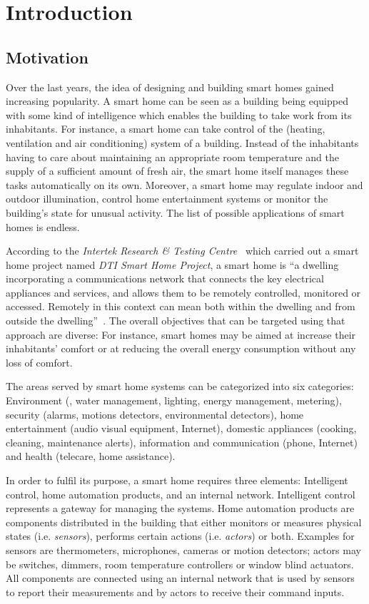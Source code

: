 \chapter{Introduction}
\label{ch:intro}

\section{Motivation}
\label{sec:motivation}

Over the last years, the idea of designing and building smart homes gained increasing popularity. A smart home can be seen as a building being equipped with some kind of intelligence which enables the building to take work from its inhabitants. For instance, a smart home can take control of the  (heating, ventilation and air conditioning) system of a building. Instead of the inhabitants having to care about maintaining an appropriate room temperature and the supply of a sufficient amount of fresh air, the smart home itself manages these tasks automatically on its own. Moreover, a smart home may regulate indoor and outdoor illumination, control home entertainment systems or monitor the building's state for unusual activity. The list of possible applications of smart homes is endless.

According to the \emph{Intertek Research \& Testing Centre}~\cite{intertek} which carried out a smart home project named \emph{DTI Smart Home Project}, a smart home is ``a dwelling incorporating a communications network that connects the key electrical appliances and services, and allows them to be remotely controlled, monitored or accessed. Remotely in this context can mean both within the dwelling and from outside the dwelling''~\cite{SmartHomeDefinition,SmartHomeResearch}. The overall objectives that can be targeted using that approach are diverse: For instance, smart homes may be aimed at increase their inhabitants' comfort or at reducing the overall energy consumption without any loss of comfort.

The areas served by smart home systems can be categorized into six categories: Environment (, water management, lighting, energy management, metering), security (alarms, motions detectors, environmental detectors), home entertainment (audio visual equipment, Internet), domestic appliances (cooking, cleaning, maintenance alerts), information and communication (phone, Internet) and health (telecare, home assistance).

In order to fulfil its purpose, a smart home requires three elements: Intelligent control, home automation products, and an internal network. Intelligent control represents a gateway for managing the systems. Home automation products are components distributed in the building that either monitors or measures physical states (i.e. \emph{sensors}), performs certain actions (i.e. \emph{actors}) or both. Examples for sensors are thermometers, microphones, cameras or motion detectors; actors may be switches, dimmers, room temperature controllers or window blind actuators. All components are connected using an internal network that is used by sensors to report their measurements and by actors to receive their command inputs.

